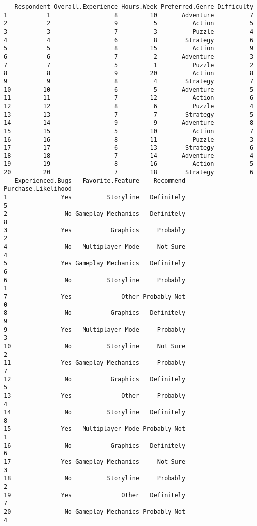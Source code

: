 \documentclass[
  letterpaper,
  DIV=11,
  numbers=noendperiod]{scrartcl}
\begin{document}
\begin{verbatim}
   Respondent Overall.Experience Hours.Week Preferred.Genre Difficulty
1           1                  8         10       Adventure          7
2           2                  9          5          Action          5
3           3                  7          3          Puzzle          4
4           4                  6          8        Strategy          6
5           5                  8         15          Action          9
6           6                  7          2       Adventure          3
7           7                  5          1          Puzzle          2
8           8                  9         20          Action          8
9           9                  8          4        Strategy          7
10         10                  6          5       Adventure          5
11         11                  7         12          Action          6
12         12                  8          6          Puzzle          4
13         13                  7          7        Strategy          5
14         14                  9          9       Adventure          8
15         15                  5         10          Action          7
16         16                  8         11          Puzzle          3
17         17                  6         13        Strategy          6
18         18                  7         14       Adventure          4
19         19                  8         16          Action          5
20         20                  7         18        Strategy          6
   Experienced.Bugs   Favorite.Feature    Recommend Purchase.Likelihood
1               Yes          Storyline   Definitely                   5
2                No Gameplay Mechanics   Definitely                   8
3               Yes           Graphics     Probably                   2
4                No   Multiplayer Mode     Not Sure                   4
5               Yes Gameplay Mechanics   Definitely                   6
6                No          Storyline     Probably                   1
7               Yes              Other Probably Not                   0
8                No           Graphics   Definitely                   9
9               Yes   Multiplayer Mode     Probably                   3
10               No          Storyline     Not Sure                   2
11              Yes Gameplay Mechanics     Probably                   7
12               No           Graphics   Definitely                   5
13              Yes              Other     Probably                   4
14               No          Storyline   Definitely                   8
15              Yes   Multiplayer Mode Probably Not                   1
16               No           Graphics   Definitely                   6
17              Yes Gameplay Mechanics     Not Sure                   3
18               No          Storyline     Probably                   2
19              Yes              Other   Definitely                   7
20               No Gameplay Mechanics Probably Not                   4
\end{verbatim}
\end{document}
